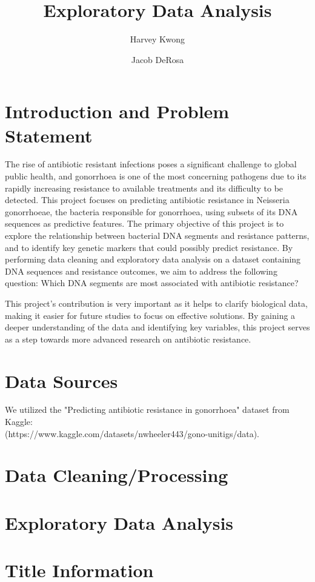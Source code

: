 \documentclass[manuscript,screen,review]{acmart}
\begin{document}
\title{Exploratory Data Analysis}

\author{Harvey Kwong}
\author{Jacob DeRosa}


\maketitle

\section{Introduction and Problem Statement}

    The rise of antibiotic resistant infections poses a significant challenge to global public health, 
and gonorrhoea is one of the most concerning pathogens due to its rapidly increasing resistance to 
available treatments and its difficulty to be detected. This project focuses on predicting antibiotic resistance 
in Neisseria gonorrhoeae, the bacteria responsible for gonorrhoea, using subsets of its DNA sequences as predictive features. 
The primary objective of this project is to explore the relationship between bacterial DNA segments and 
resistance patterns, and to identify key genetic markers that could possibly predict resistance. By performing data 
cleaning and exploratory data analysis on a dataset containing DNA sequences and resistance outcomes, 
we aim to address the following question: Which DNA segments are most associated with antibiotic resistance? 

    This project’s contribution is very important as it helps to clarify biological data, making it easier for 
future studies to focus on effective solutions. By gaining a deeper understanding of the data and identifying 
key variables, this project serves as a step towards more advanced research on antibiotic resistance.

\section{Data Sources}

    We utilized the "Predicting antibiotic resistance in gonorrhoea" dataset from Kaggle: \\
    (https://www.kaggle.com/datasets/nwheeler443/gono-unitigs/data). \\


\section{Data Cleaning/Processing}



\section{Exploratory Data Analysis}


\section{Title Information}
\end{document}

